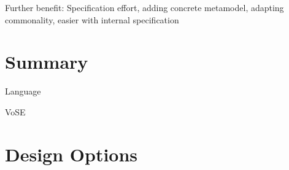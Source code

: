 Further benefit: Specification effort, adding concrete metamodel, adapting commonality, easier with internal specification


\section{Summary}

\begin{insight}{Language}

\end{insight}


\begin{copiedFrom}{VoSE}




\section*{Design Options}


\end{copiedFrom}
